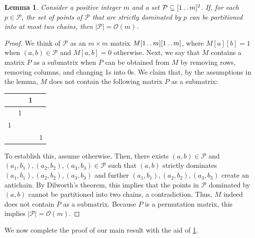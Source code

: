 \documentclass[11pt,letterpaper]{article}
\newcommand{\cO}{\mathcal{O}}
\def\dd{\mathinner{.\,.}}
\renewcommand{\P}{\mathcal{P}}
\newtheorem{lemma}[theorem]{Lemma}
\begin{document}
\begin{lemma}\label{lem:geom}
Consider a positive integer $m$ and a set $\P \subseteq [1 \dd m]^2$.
If, for each $p \in \P$, the set
of points of $\P$ that are strictly dominated by $p$
can be partitioned into at most two chains,
then $|\P|=\cO(m)$.
\end{lemma}

\begin{proof}
We think of $\P$ as an $m\times m$ matrix $M[1\dd m][1\dd m]$, where $M[a][b]=1$ when $(a,b)\in \P$ and
$M[a,b]=0$ otherwise. Next, we say that $M$ contains a matrix $P$ as a submatrix when $P$ can be obtained
from $M$ by removing rows, removing columns, and changing 1s into 0s. We claim that, by the assumptions
in the lemma, $M$ does not contain the following matrix $P$ as a submatrix:
\begin{center}
\begin{tabular}{ |c|c|c|c| } 
 \hline
 & &  1 & \\ 
 \hline
 & 1 &  & \\ 
 \hline
 1 & &  & \\ 
 \hline
 & &  & 1 \\ 
 \hline
\end{tabular}
\end{center}
To establish this, assume otherwise. Then, there exists $(a,b)\in \P$ and $(a_{1},b_{1}),(a_{2},b_{2}),(a_{3},b_{3})\in \P$
such that $(a,b)$ strictly dominates $(a_{1},b_{1}),(a_{2},b_{2}),(a_{3},b_{3})$ and further
$(a_{1},b_{1}),(a_{2},b_{2}),(a_{3},b_{3})$ create an antichain. By Dilworth's theorem, this implies that
the points in $\P$ dominated by $(a,b)$ cannot be partitioned into two chains, a contradiction.
Thus, $M$ indeed does not contain $P$ as a submatrix. Because $P$ is a permutation matrix,
this implies $|\P|=\cO(m)$.
\end{proof}

We now complete the proof of our main result with the aid of \cref{lem:geom}.
\end{document}
